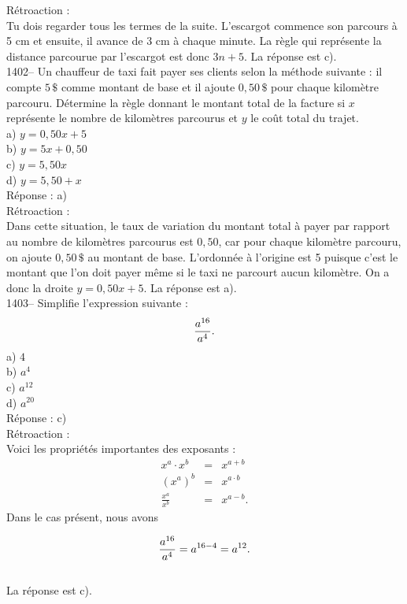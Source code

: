 R\'etroaction :\\
Tu dois regarder tous les termes de la suite. L'escargot commence
son parcours \`a 5 cm et ensuite, il avance de 3 cm \`a chaque
minute. La r\`egle qui repr\'esente la distance parcourue par
l'escargot est
donc $3n+5$. La r\'eponse est c).\\

1402-- Un chauffeur de taxi fait payer ses clients selon la m\'ethode
suivante : il compte $5\,\$$ comme montant de base et il ajoute
$0,50\,\$$ pour chaque kilom\`etre parcouru. D\'etermine la r\`egle
donnant le montant total de la facture si $x$ repr\'esente le nombre
de kilom\`etres parcourus et $y$ le co\^ut total du trajet.\\
a) $y=0,50x+5$\\
b) $y=5x+0,50$\\
c) $y=5,50x$\\
d) $y=5,50+x$\\

R\'eponse : a)\\

R\'etroaction :\\
Dans cette situation, le taux de variation du montant total \`a
payer par rapport au nombre de kilom\`etres parcourus est $0,50$,
car pour chaque kilom\`etre parcouru, on ajoute $0,50\,\$$ au
montant de base. L'ordonn\'ee \`a l'origine est 5 puisque c'est le
montant que l'on doit payer m\^eme si le taxi ne parcourt aucun
kilom\`etre. On
a donc la droite $y=0,50x+5$. La r\'eponse est a).\\

1403-- Simplifie l'expression suivante :
$${\LARGE \frac {a^{16}}{a^4}}.$$
a) $4$\\
b) $a^4$\\
c) $a^{12}$\\
d) $a^{20}$\\

R\'eponse : c)\\

R\'etroaction :\\
Voici les propri\'et\'es importantes des exposants :
\begin{eqnarray*}
x^a\cdot x^b&=&x^{a+b} \\ (x^a)^b&=&x^{a \cdot b} \\
\frac{x^a}{x^b}&=& x^{a-b}.
\end{eqnarray*}
Dans le cas pr\'esent, nous avons

$${\LARGE \frac {a^{16}}{a^4}}=a^{16-4}=a^{12}.$$\\
La r\'eponse est c).\\


